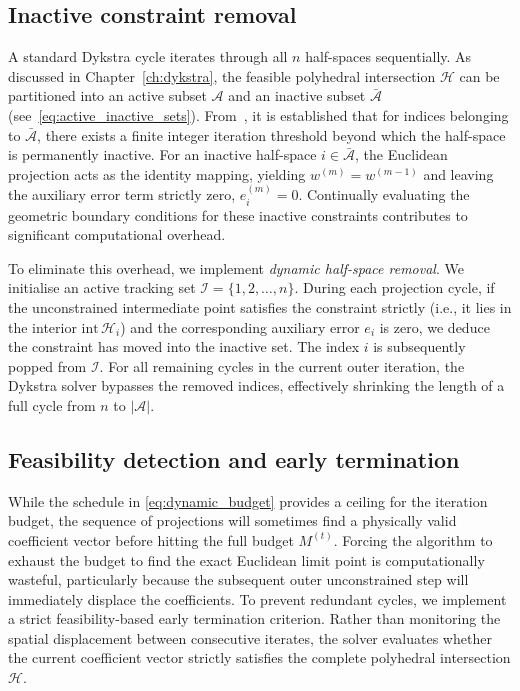 \subsection{Inactive constraint removal}
A standard Dykstra cycle iterates through all $n$ half-spaces sequentially. As discussed in Chapter~\ref{ch:dykstra}, the feasible polyhedral intersection $\mathcal{H}$ can be partitioned into an active subset $\mathcal{A}$ and an inactive subset $\bar{\mathcal{A}}$ (see~\eqref{eq:active_inactive_sets}). From~\cite[Lemma~3.1]{DYKSTRAPOLY}, it is established that for indices belonging to $\bar{\mathcal{A}}$, there exists a finite integer iteration threshold beyond which the half-space is permanently inactive. For an inactive half-space $i \in \bar{\mathcal{A}}$, the Euclidean projection acts as the identity mapping, yielding $w^{(m)} = w^{(m-1)}$ and leaving the auxiliary error term strictly zero, $e_i^{(m)} = 0$. Continually evaluating the geometric boundary conditions for these inactive constraints contributes to significant computational overhead. 

To eliminate this overhead, we implement \emph{dynamic half-space removal}. We initialise an active tracking set $\mathcal{I} = \{1, 2, \dots, n\}$. During each projection cycle, if the unconstrained intermediate point satisfies the constraint strictly (i.e., it lies in the interior $\mathrm{int}\,\mathcal{H}_i$) and the corresponding auxiliary error $e_i$ is zero, we deduce the constraint has moved into the inactive set. The index $i$ is subsequently popped from $\mathcal{I}$. For all remaining cycles in the current outer iteration, the Dykstra solver bypasses the removed indices, effectively shrinking the length of a full cycle from $n$ to $|\mathcal{A}|$.

\subsection{Feasibility detection and early termination}
While the schedule in \eqref{eq:dynamic_budget} provides a ceiling for the iteration budget, the sequence of projections will sometimes find a physically valid coefficient vector before hitting the full budget $M^{(t)}$. Forcing the algorithm to exhaust the budget to find the exact Euclidean limit point is computationally wasteful, particularly because the subsequent outer unconstrained step will immediately displace the coefficients. To prevent redundant cycles, we implement a strict feasibility-based early termination criterion. Rather than monitoring the spatial displacement between consecutive iterates, the solver evaluates whether the current coefficient vector strictly satisfies the complete polyhedral intersection $\mathcal{H}$. 

